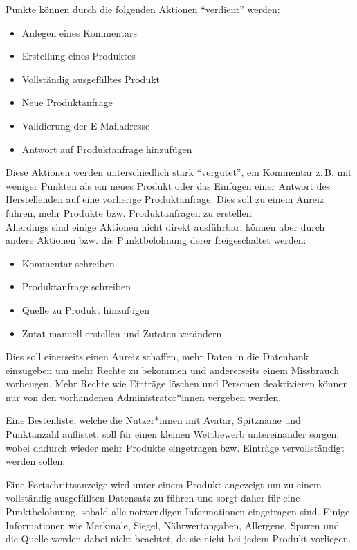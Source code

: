 Punkte können durch die folgenden Aktionen "`verdient"' werden:
\begin{itemize}
  \item Anlegen eines Kommentars
  \item Erstellung eines Produktes
  \item Vollständig ausgefülltes Produkt
  \item Neue Produktanfrage
  \item Validierung der E-Mailadresse
  \item Antwort auf Produktanfrage hinzufügen
\end{itemize}

Diese Aktionen werden unterschiedlich stark "`vergütet"', ein Kommentar z.\,B. 
mit weniger Punkten als ein neues Produkt oder das Einfügen einer Antwort des 
Herstellenden auf eine vorherige Produktanfrage.
Dies soll zu einem Anreiz führen, mehr Produkte bzw. Produktanfragen zu 
erstellen.\\
Allerdings sind einige Aktionen nicht direkt ausführbar, können aber durch 
andere Aktionen bzw. die Punktbelohnung derer freigeschaltet werden:
\begin{itemize}
  \item Kommentar schreiben
  \item Produktanfrage schreiben
  \item Quelle zu Produkt hinzufügen
  \item Zutat manuell erstellen und Zutaten verändern
\end{itemize}

Dies soll einerseits einen Anreiz schaffen, mehr Daten in die Datenbank 
einzugeben um mehr Rechte zu bekommen und andererseits einem Missbrauch 
vorbeugen.
Mehr Rechte wie Einträge löschen und Personen deaktivieren können nur von den 
vorhandenen Administrator*innen vergeben werden.

Eine Bestenliste, welche die Nutzer*innen mit Avatar, Spitzname und
Punktanzahl auflistet, soll für einen kleinen Wettbewerb untereinander
sorgen, wobei dadurch wieder mehr Produkte eingetragen bzw. Einträge
vervollständigt werden sollen.

Eine Fortschrittsanzeige wird unter einem Produkt angezeigt um
zu einem vollständig ausgefüllten Datensatz zu führen und sorgt daher für 
eine Punktbelohnung, sobald alle notwendigen Informationen eingetragen sind.
Einige Informationen wie Merkmale, Siegel, Nährwertangaben, Allergene, Spuren 
und die Quelle werden dabei nicht beachtet, da sie nicht bei jedem Produkt 
vorliegen.

